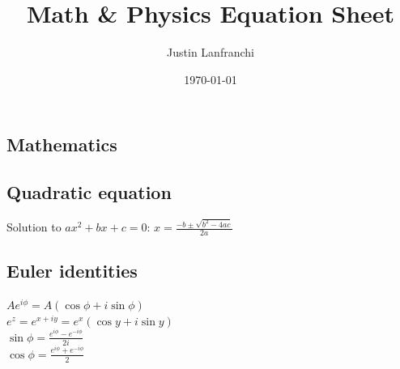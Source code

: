 \documentclass[letterpaper,landscape,10pt]{article}
\title{Math \& Physics Equation Sheet}
\author{Justin Lanfranchi}
\date{\today}
\newif\iftechexplorer\techexplorerfalse
\begin{document}
{
\raggedright


\fontsize{6}{1}\selectfont %

\begin{multicols}{4}


\iftechexplorer
  \maketitle
\fi

\section*{Mathematics}

	\subsection*{Quadratic equation}
		Solution to $ax^2+bx+c=0$: $x = \frac{-b \pm \sqrt{b^2-4ac}}{2a}$

	\subsection*{Euler identities}
		{\centering
		$Ae^{i\phi} = A(\cos\phi + i\sin\phi)$ \\
		$e^{z} = e^{x+iy} = e^{x}(\cos y + i \sin y)$  \\
		$\sin\phi = \frac{e^{i\phi}-e^{-i\phi}}{2i}$ \\
		$\cos\phi = \frac{e^{i\phi}+e^{-i\phi}}{2}$ \\
		}


\end{multicols}}
\end{document}
